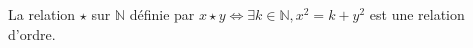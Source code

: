 La relation $\star$ sur $\mathbb N$ définie par $x\star y \iff \exists k\in\mathbb N, x^2=k+y^2$ est une relation d'ordre.

\begin{reponses}
\end{reponses}

